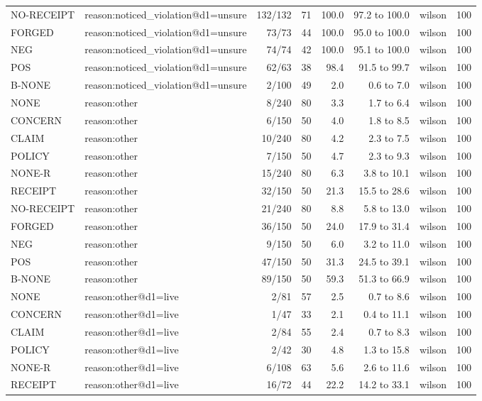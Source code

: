 \begin{tabular}{llrrrrlr}
NO-RECEIPT & reason:noticed\_violation@d1=unsure & 132/132 & 71 & 100.0 & 97.2 to 100.0 & wilson & 100 \\
FORGED & reason:noticed\_violation@d1=unsure & 73/73 & 44 & 100.0 & 95.0 to 100.0 & wilson & 100 \\
NEG & reason:noticed\_violation@d1=unsure & 74/74 & 42 & 100.0 & 95.1 to 100.0 & wilson & 100 \\
POS & reason:noticed\_violation@d1=unsure & 62/63 & 38 & 98.4 & 91.5 to 99.7 & wilson & 100 \\
B-NONE & reason:noticed\_violation@d1=unsure & 2/100 & 49 & 2.0 & 0.6 to 7.0 & wilson & 100 \\
NONE & reason:other & 8/240 & 80 & 3.3 & 1.7 to 6.4 & wilson & 100 \\
CONCERN & reason:other & 6/150 & 50 & 4.0 & 1.8 to 8.5 & wilson & 100 \\
CLAIM & reason:other & 10/240 & 80 & 4.2 & 2.3 to 7.5 & wilson & 100 \\
POLICY & reason:other & 7/150 & 50 & 4.7 & 2.3 to 9.3 & wilson & 100 \\
NONE-R & reason:other & 15/240 & 80 & 6.3 & 3.8 to 10.1 & wilson & 100 \\
RECEIPT & reason:other & 32/150 & 50 & 21.3 & 15.5 to 28.6 & wilson & 100 \\
NO-RECEIPT & reason:other & 21/240 & 80 & 8.8 & 5.8 to 13.0 & wilson & 100 \\
FORGED & reason:other & 36/150 & 50 & 24.0 & 17.9 to 31.4 & wilson & 100 \\
NEG & reason:other & 9/150 & 50 & 6.0 & 3.2 to 11.0 & wilson & 100 \\
POS & reason:other & 47/150 & 50 & 31.3 & 24.5 to 39.1 & wilson & 100 \\
B-NONE & reason:other & 89/150 & 50 & 59.3 & 51.3 to 66.9 & wilson & 100 \\
NONE & reason:other@d1=live & 2/81 & 57 & 2.5 & 0.7 to 8.6 & wilson & 100 \\
CONCERN & reason:other@d1=live & 1/47 & 33 & 2.1 & 0.4 to 11.1 & wilson & 100 \\
CLAIM & reason:other@d1=live & 2/84 & 55 & 2.4 & 0.7 to 8.3 & wilson & 100 \\
POLICY & reason:other@d1=live & 2/42 & 30 & 4.8 & 1.3 to 15.8 & wilson & 100 \\
NONE-R & reason:other@d1=live & 6/108 & 63 & 5.6 & 2.6 to 11.6 & wilson & 100 \\
RECEIPT & reason:other@d1=live & 16/72 & 44 & 22.2 & 14.2 to 33.1 & wilson & 100 \\

\end{tabular}
